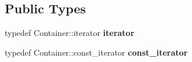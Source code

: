 \subsection*{Public Types}
\begin{DoxyCompactItemize}
\item 
\mbox{\label{classel_1_1base_1_1utils_1_1_abstract_registry_a58d0536c748633afd3f7c237b63a9a7c}} 
typedef Container\+::iterator {\bfseries iterator}
\item 
\mbox{\label{classel_1_1base_1_1utils_1_1_abstract_registry_a3bbf19b112c067cb1a02a82b003cc7e2}} 
typedef Container\+::const\+\_\+iterator {\bfseries const\+\_\+iterator}
\end{DoxyCompactItemize}
